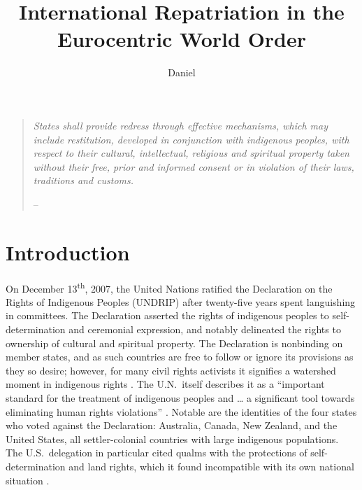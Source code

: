 \documentclass{../../../coursework}
\title{International Repatriation in the Eurocentric World Order}
\subtitle{}
\author{Daniel}{Glenn}{Leonard}
\date{\displaydate{date}}
\begin{document}
\maketitle

\begin{quote}
    \centering\emph{States shall provide redress through effective
    mechanisms, which may include restitution, developed in conjunction with
    indigenous peoples, with respect to their cultural, intellectual,
    religious and spiritual property taken without their free, prior and
    informed consent or in violation of their laws, traditions and customs.}
    
    --~\textcite[Article 11, Section 2]{Uni07}
\end{quote}

\section{Introduction}

On December 13\textsuperscript{th}, 2007, the United Nations ratified the
Declaration on the Rights of Indigenous Peoples (UNDRIP) after twenty-five
years spent languishing in committees. The Declaration asserted the rights of
indigenous peoples to self-determination and ceremonial expression, and
notably delineated the rights to ownership of cultural and spiritual property.
The Declaration is nonbinding on member states, and as such countries are free
to follow or ignore its provisions as they so desire; however, for many civil
rights activists it signifies a watershed moment in indigenous rights
\parencite{Wei12}. The U.N.\ itself describes it as a ``important standard for
the treatment of indigenous peoples and … a significant tool towards
eliminating human rights violations'' \parencite[2]{UniFAQ}. Notable are the
identities of the four states who voted against the Declaration: Australia,
Canada, New Zealand, and the United States, all settler-colonial countries
with large indigenous populations. The U.S.\ delegation in particular cited
qualms with the protections of self-determination and land rights, which it
found incompatible with its own national situation \parencite{Uni071}.
\end{document}
